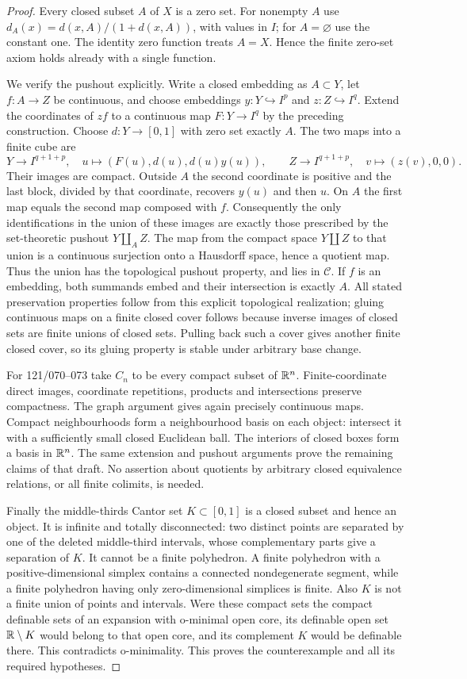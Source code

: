 \begin{proof}
Every closed subset $A$ of $X$ is a zero set. For nonempty $A$
use $d_A(x)=d(x,A)/(1+d(x,A))$, with values in $I$; for
$A=\varnothing$ use the constant one. The identity zero
function treats $A=X$. Hence the finite zero-set axiom holds
already with a single function.

We verify the pushout explicitly. Write a closed embedding as
$A\subset Y$, let $f:A\to Z$ be continuous, and choose
embeddings $y:Y\hookrightarrow I^p$ and
$z:Z\hookrightarrow I^q$. Extend the coordinates of $z f$
to a continuous map $F:Y\to I^q$ by the preceding construction.
Choose $d:Y\to[0,1]$ with zero set exactly $A$. The two maps
into a finite cube are
\[
 Y\longrightarrow I^{q+1+p},\quad
 u\longmapsto(F(u),d(u),d(u)y(u)),\qquad
 Z\longrightarrow I^{q+1+p},\quad
 v\longmapsto(z(v),0,0).
\]
Their images are compact. Outside $A$ the second coordinate
is positive and the last block, divided by that coordinate,
recovers $y(u)$ and then $u$. On $A$ the first map equals
the second map composed with $f$. Consequently the only
identifications in the union of these images are exactly those
prescribed by the set-theoretic pushout $Y\amalg_A Z$.
The map from the compact space $Y\amalg Z$ to that union is
a continuous surjection onto a Hausdorff space, hence a
quotient map. Thus the union has the topological pushout
property, and lies in $\mathcal C$. If $f$ is an embedding,
both summands embed and their intersection is exactly $A$.
All stated preservation properties follow from this explicit
topological realization; gluing continuous maps on a finite
closed cover follows because inverse images of closed sets
are finite unions of closed sets. Pulling back such a cover
gives another finite closed cover, so its gluing property is
stable under arbitrary base change.

For 121/070--073 take $C_n$ to be every compact subset of
$\mathbb R^n$. Finite-coordinate direct images, coordinate
repetitions, products and intersections preserve compactness.
The graph argument gives again precisely continuous maps.
Compact neighbourhoods form a neighbourhood basis on each
object: intersect it with a sufficiently small closed Euclidean
ball. The interiors of closed boxes form a basis in $\mathbb R^n$.
The same extension and pushout arguments prove the remaining
claims of that draft. No assertion about quotients by arbitrary
closed equivalence relations, or all finite colimits, is needed.

Finally the middle-thirds Cantor set $K\subset[0,1]$ is a
closed subset and hence an object. It is infinite and totally
disconnected: two distinct points are separated by one of the
deleted middle-third intervals, whose complementary parts
give a separation of $K$. It cannot be a finite polyhedron.
A finite polyhedron with a positive-dimensional simplex
contains a connected nondegenerate segment, while a finite
polyhedron having only zero-dimensional simplices is finite.
Also $K$ is not a finite union of points and intervals. Were
these compact sets the compact definable sets of an expansion
with o-minimal open core, its definable open set $\mathbb R\setminus K$
would belong to that open core, and its complement $K$ would
be definable there. This contradicts o-minimality. This proves
the counterexample and all its required hypotheses.
\end{proof}
